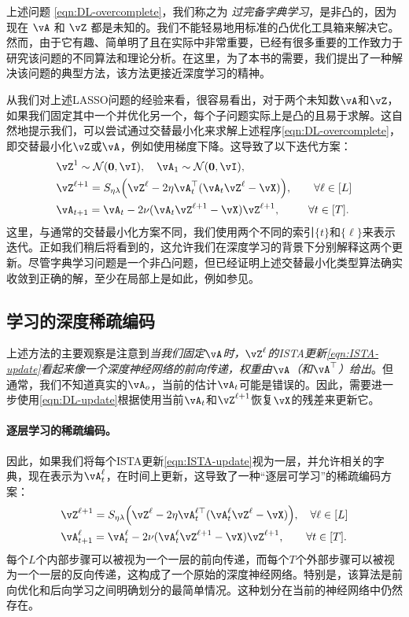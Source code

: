 \documentclass[../../book-main.tex]{subfiles}
\begin{document}
上述问题 \eqref{eqn:DL-overcomplete}，我们称之为 \textit{过完备字典学习}，是非凸的，因为现在 $\vA$ 和 $\vZ$ 都是未知的。我们不能轻易地用标准的凸优化工具箱来解决它。然而，由于它有趣、简单明了且在实际中非常重要，已经有很多重要的工作致力于研究该问题的不同算法和理论分析。在这里，为了本书的需要，我们提出了一种解决该问题的典型方法，该方法更接近深度学习的精神。

从我们对上述LASSO问题的经验来看，很容易看出，对于两个未知数$\vA$和$\vZ$，如果我们固定其中一个并优化另一个，每个子问题实际上是凸的且易于求解。这自然地提示我们，可以尝试通过交替最小化来求解上述程序\eqref{eqn:DL-overcomplete}，即交替最小化$\vZ$或$\vA$，例如使用梯度下降。这导致了以下迭代方案：
\begin{align}
    & \vZ^{1}
     \sim \dNorm(\vzero, \vI), \quad \vA_{1}
     \sim \dNorm(\vzero, \vI), \\ 
    &\vZ^{\ell + 1} = S_{\eta\lambda}\rp{\vZ^{\ell} - 2\eta\vA_{t}^{\top}(\vA_{t}\vZ^{\ell} - \vX)}, \qquad \forall \ell \in [L] \label{eqn:ISTA-update}\\ 
    &\vA_{t + 1} = \vA_{t} - 2\nu (\vA_{t}\vZ^{\ell + 1} - \vX)\vZ^{\ell + 1}, \qquad\;\; \forall t \in [T].\label{eqn:DL-update}
\end{align}
这里，与通常的交替最小化方案不同，我们使用两个不同的索引$\{t\}$和$\{\ell\}$来表示迭代。正如我们稍后将看到的，这允许我们在深度学习的背景下分别解释这两个更新。尽管字典学习问题是一个非凸问题，但已经证明上述交替最小化类型算法确实收敛到正确的解，至少在局部上是如此，例如参见\cite{alekh-2016}。


\subsection{学习的深度稀疏编码}
\label{sec:LISTA}
上述方法的主要观察是注意到\textit{当我们固定$\vA$时，$\vZ^\ell$的ISTA更新\eqref{eqn:ISTA-update}看起来像一个深度神经网络的前向传递，权重由$\vA$（和$\vA^{\top}$）给出}。但通常，我们不知道真实的$\vA_o$，当前的估计$\vA_t$可能是错误的。因此，需要进一步使用\eqref{eqn:DL-update}根据使用当前$\vA_t$和$\vZ^{\ell +1}$恢复$\vX$的残差来更新它。

\paragraph{逐层学习的稀疏编码。}
因此，如果我们将每个ISTA更新\eqref{eqn:ISTA-update}视为一层，并允许相关的字典，现在表示为$\vA_t^\ell$，在时间上更新，这导致了一种“逐层可学习”的稀疏编码方案：
\begin{align}
    & \vZ^{\ell + 1} = S_{\eta\lambda}\rp{\vZ^{\ell} - 2\eta\vA_{t}^{\ell\top}(\vA_{t}^\ell\vZ^{\ell} - \vX)}, \quad \forall \ell \in [L] \\ 
    & \vA_{t + 1}^\ell = \vA_{t}^\ell - 2\nu (\vA_{t}^\ell\vZ^{\ell + 1} - \vX)\vZ^{\ell + 1}, \qquad \forall t \in [T].
\end{align}
每个$L$个内部步骤可以被视为一个一层的前向传递，而每个$T$个外部步骤可以被视为一个一层的反向传递，这构成了一个原始的深度神经网络。特别是，该算法是前向优化和后向学习之间明确划分的最简单情况。这种划分在当前的神经网络中仍然存在。
\end{document}

